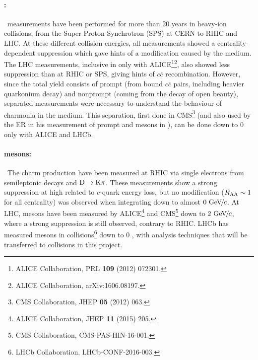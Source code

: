 \documentclass[a4paper,11pt]{article}
\newcommand{\ER}{ER\xspace}
\begin{document}
\paragraph{\Jpsi:\ }\ 
\Jpsi measurements have been performed for more than 20 years in heavy-ion collisions, from the Super Proton Synchrotron (SPS) at CERN to RHIC and LHC. 
At these different collision energies, all measurements showed a centrality-dependent suppression
which gave hints of a modification caused by the medium. The LHC measurements, inclusive in \pt only with ALICE\footnote{ALICE Collaboration, PRL {\bf 109} (2012) 072301.}\footnote{ALICE Collaboration, arXiv:1606.08197.}, also showed less suppression than at RHIC or SPS, giving hints of $c\bar{c}$ recombination. However, since the total \Jpsi yield 
consists of prompt \Jpsi (from bound $c\bar{c}$ pairs, including heavier quarkonium decay) and nonprompt \Jpsi (coming
from the decay of open beauty), separated measurements were necessary to understand the behaviour of charmonia in the medium. 
This separation, first done in CMS\footnote{CMS Collaboration, JHEP {\bf 05} (2012) 063.} (and also used by the \ER in his measurement of prompt \Jpsi and \psiP mesons in \pbpb), can be done down to 0 \pt only with ALICE 
and LHCb. 



\paragraph{\D mesons:\ }\ 
The charm production have been measured at RHIC via single
electrons from semileptonic decays and $\text{D} \to \text{K}\pi$. These measurements show a strong suppression at
high \pt related to $c$-quark energy loss, but no modification ($R_{\text{AA}} \sim 1$ for all centrality) was observed
when integrating down to almost $0\,{\,\text{Ge\hspace{-.08em}V\hspace{-0.16em}/\hspace{-0.08em}}c}$. 
At LHC, \D mesons have been measured by ALICE\footnote{\label{ALICED}ALICE Collaboration, JHEP {\bf 11} (2015) 205.} and CMS\footnote{CMS Collaboration, CMS-PAS-HIN-16-001.} down to $2\,{\,\text{Ge\hspace{-.08em}V\hspace{-0.16em}/\hspace{-0.08em}}c}$, where
a strong suppression is still observed, contrary to RHIC. 
LHCb has measured \D mesons in \ppb collisions\footnote{LHCb Collaboration, LHCb-CONF-2016-003.} down to 0 \pt, with analysis techniques
that will be transferred to \pbpb collisions in this project.
\end{document}
